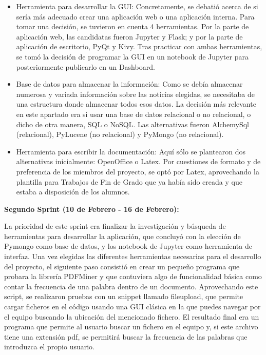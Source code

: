 \begin{itemize}

\item Herramienta para desarrollar la GUI: Concretamente, se debatió acerca de si sería más adecuado crear una aplicación web o una aplicación interna. Para tomar una decisión, se tuvieron en cuenta 4 herramientas. Por la parte de aplicación web, las candidatas fueron Jupyter y Flask; y por la parte de aplicación de escritorio, PyQt y Kivy. Tras practicar con ambas herramientas, se tomó la decisión de programar la GUI en un notebook de Jupyter para posteriormente publicarlo en un Dashboard.

\item Base de datos para almacenar la información: Como se debía almacenar numerosa y variada información sobre las noticias elegidas, se necesitaba de una estructura donde almacenar todos esos datos. La decisión más relevante en este apartado era si usar una base de datos relacional o no relacional, o dicho de otra manera, SQL o NoSQL. Las alternativas fueron AlchemySql (relacional), PyLucene (no relacional) y PyMongo (no relacional).

\item Herramienta para escribir la documentación: Aquí sólo se plantearon dos alternativas inicialmente: OpenOffice o Latex. Por cuestiones de formato y de preferencia de los miembros del proyecto, se optó por Latex, aprovechando la plantilla para Trabajos de Fin de Grado que ya había sido creada y que estaba a disposición de los alumnos.

\end{itemize}



\textbf{Segundo Sprint (10 de Febrero - 16 de Febrero):}

La prioridad de este sprint era finalizar la investigación y búsqueda de herramientas para desarrollar la aplicación, que concluyó con la elección de Pymongo como base de datos, y los notebook de Jupyter como herramienta de interfaz.
Una vez elegidas las diferentes herramientas necesarias para el desarrollo del proyecto, el siguiente paso consistió en crear un pequeño programa que probara la librería PDFMiner y que contuviera algo de funcionalidad básica como contar la frecuencia de una palabra dentro de un documento.
Aprovechando este script, se realizaron pruebas con un snippet llamado fileupload, que permite cargar ficheros en el código usando una GUI clásica en la que puedes navegar por el equipo buscando la ubicación del mencionado fichero. El resultado final era un programa que  permite al usuario buscar un fichero en el equipo y, si este archivo tiene una extensión pdf, se permitirá buscar la frecuencia de las palabras que introduzca el propio usuario.

